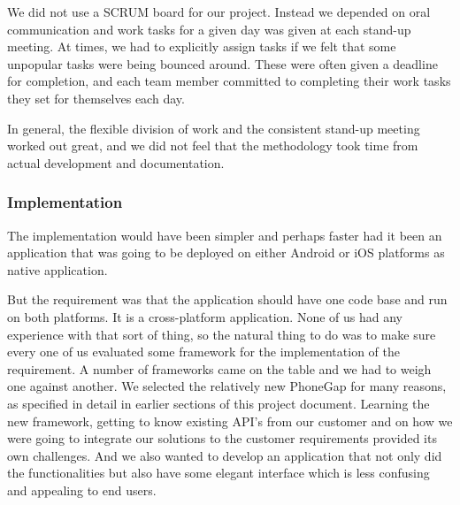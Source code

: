We did not use a SCRUM board for our project. Instead we depended on oral 
communication and work tasks for a given day was given at each stand-up meeting.
At times, we had to explicitly assign tasks if we felt that some
unpopular tasks were being bounced around. These were often given a deadline for
completion, and each team member committed to completing their work tasks they
set for themselves each day.

In general, the flexible division of work and the consistent stand-up meeting
worked out great, and we did not feel that the methodology took time from actual
development and documentation. 

	\subsubsection{Implementation}
The implementation would have been simpler and perhaps faster had it been an
application that was going to be deployed on either Android or iOS platforms as
native application.

But the requirement was that the application should have one code base and run
on both platforms.
It is a cross-platform application.
None of us had any experience with that sort of thing, so the natural thing to
do was to make sure every one of us evaluated some framework for the
implementation of the requirement.
A number of frameworks came on the table and we had to weigh one against another.
We selected the relatively new PhoneGap for many reasons, as specified in detail
in earlier sections of this project document.
Learning the new framework, getting to know existing API's from our customer and
on how we were going to integrate our solutions to the customer requirements
provided its own challenges.
And we also wanted to develop an application that not only did the
functionalities but also have some elegant interface which is less confusing and
appealing to end users.

